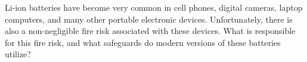 \begin{enumerate}
    Li-ion batteries have become very common in cell phones, digital cameras,
    laptop computers, and many other portable electronic devices.
    Unfortunately, there is also a non-negligible fire risk associated with
    these devices.  What is responsible for this fire risk, and what safeguards
    do modern versions of these batteries utilize?

\end{enumerate}


